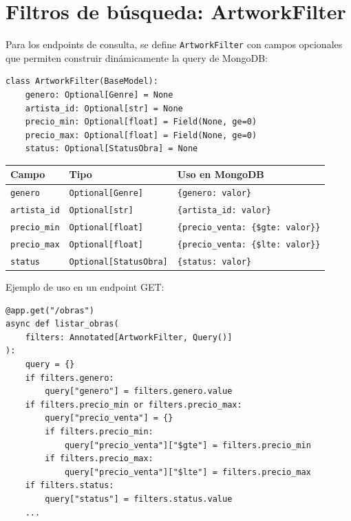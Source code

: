 \documentclass[12pt,a4paper]{article}
\begin{document}
\section{Filtros de búsqueda: ArtworkFilter}

Para los endpoints de consulta, se define \texttt{ArtworkFilter} con campos
opcionales que permiten construir dinámicamente la query de MongoDB:

\begin{lstlisting}
class ArtworkFilter(BaseModel):
    genero: Optional[Genre] = None
    artista_id: Optional[str] = None
    precio_min: Optional[float] = Field(None, ge=0)
    precio_max: Optional[float] = Field(None, ge=0)
    status: Optional[StatusObra] = None
\end{lstlisting}

\begin{center}
\begin{tabular}{lll}
\toprule
\textbf{Campo} & \textbf{Tipo} & \textbf{Uso en MongoDB} \\
\midrule
\texttt{genero} & \texttt{Optional[Genre]} & \texttt{\{genero: valor\}} \\
\texttt{artista\_id} & \texttt{Optional[str]} & \texttt{\{artista\_id: valor\}} \\
\texttt{precio\_min} & \texttt{Optional[float]} & \texttt{\{precio\_venta: \{\$gte: valor\}\}} \\
\texttt{precio\_max} & \texttt{Optional[float]} & \texttt{\{precio\_venta: \{\$lte: valor\}\}} \\
\texttt{status} & \texttt{Optional[StatusObra]} & \texttt{\{status: valor\}} \\
\bottomrule
\end{tabular}
\end{center}

Ejemplo de uso en un endpoint GET:

\begin{lstlisting}
@app.get("/obras")
async def listar_obras(
    filters: Annotated[ArtworkFilter, Query()]
):
    query = {}
    if filters.genero:
        query["genero"] = filters.genero.value
    if filters.precio_min or filters.precio_max:
        query["precio_venta"] = {}
        if filters.precio_min:
            query["precio_venta"]["$gte"] = filters.precio_min
        if filters.precio_max:
            query["precio_venta"]["$lte"] = filters.precio_max
    if filters.status:
        query["status"] = filters.status.value
    ...
\end{lstlisting}
\end{document}
